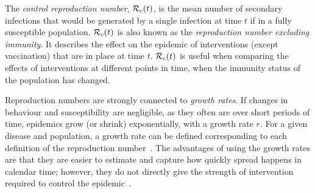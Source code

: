 \documentclass[thesis.tex]{subfiles}
\begin{document}
The \emph{control reproduction number}, $\mathcal{R}_{c}(t)$, is the mean number of secondary infections that would be generated by a single infection at time $t$ if in a fully susceptible population.
$\mathcal{R}_{c}(t)$ is also known as the \emph{reproduction number excluding immunity}.
It describes the effect on the epidemic of interventions (except vaccination) that are in place at time $t$.
$\mathcal{R}_{c}(t)$ is useful when comparing the effects of interventions at different points in time, when the immunity status of the population has changed.



Reproduction numbers are strongly connected to \emph{growth rates}.
If changes in behaviour and susceptibility are negligible, as they often are over short periods of time, epidemics grow (or shrink) exponentially, with a growth rate $r$.
For a given disease and population, a growth rate can be defined corresponding to each definition of the reproduction number~\autocite{pellisEstimation,paragGrowthRates,wallingaGI}.
The advantages of using the growth rates are that they are easier to estimate and capture how quickly spread happens in calendar time; however, they do not directly give the strength of intervention required to control the epidemic~\autocite{royalSocietyRnumber}.
\end{document}
